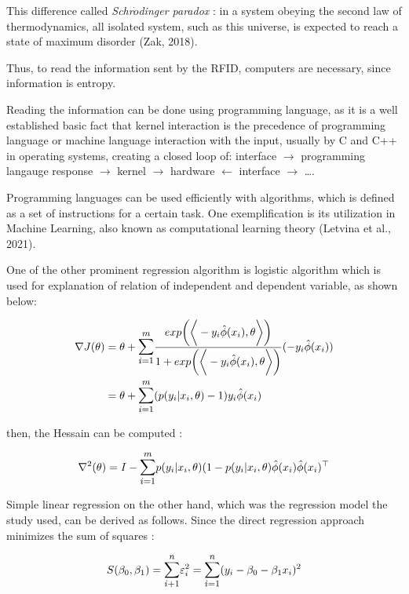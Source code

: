 \documentclass[12pt]{article}
\begin{document}
This difference called \textit{Schr$\dot{o}$dinger paradox} : in a system obeying the second law of thermodynamics, all isolated system, such as this universe, is expected to reach a state of maximum disorder (Zak, 2018).

Thus, to read the information sent by the RFID, computers are necessary, since information is entropy.

Reading the information can be done using programming language, as it is a well established basic fact that kernel interaction is the precedence of programming language or machine language interaction with the input, usually by C and C++ in operating systems, creating a
closed loop of: interface $\longrightarrow$ programming langauge response $\longrightarrow$ kernel $\longrightarrow$ hardware $\longleftarrow$ interface $\longrightarrow$ \dots.

Programming languages can be used efficiently with algorithms, which is defined as a set of instructions for a certain task. One exemplification is its utilization in Machine Learning,
also known as computational learning theory (Letvina et al., 2021).
	
One of the other prominent regression algorithm is logistic algorithm which is used for explanation of relation of independent and dependent variable, as shown below:
	

\begin{align}
	\nabla J(\theta) &= \theta + \mathlarger{\sum^{m}_{i=1}} \frac{exp \bigg( \bigg \langle  -y_i \hat{\phi} (x_i), \theta \bigg \rangle \bigg)}{1 + exp \bigg(\bigg \langle  -y_i \hat{\phi} (x_i), \theta \bigg \rangle \bigg )} (-y_i \hat{\phi} (x_i)) \nonumber \\
	&= \theta + \mathlarger{\sum^{m}_{i=1}} (p(y_i|x_i, \theta) - 1)y_i \hat{\phi}(x_i) \nonumber
\end{align}

then, the Hessain can be computed :

\begin{align}
	\nabla ^2 (\theta) = I - \mathlarger{\sum^{m}_{i=1}}p (y_i|x_i, \theta) (1 - p (y_i|x_i, \theta) \hat{\phi} (x_i) \hat{\phi} (x_i)^\top
\end{align}

Simple linear regression on the other hand, which was the regression model the study used, can be derived as follows. Since the direct regression approach minimizes the sum of squares :

\begin{align*}
	S(\beta_0, \beta_1) = \mathlarger{\sum^{n}_{i+1}} \varepsilon^2_i = \mathlarger{\sum^{n}_{i=1}} (y_i - \beta_0 -\beta_1 x_i)^2 \nonumber 
\end{align*}
\end{document}
